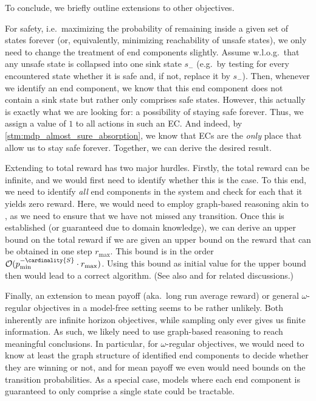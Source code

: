 \documentclass{article}
\newcommand{\States}{S}
\newcommand{\sinkstate}{s_-}
\begin{document}
\begin{remark}
	To conclude, we briefly outline extensions to other objectives.

	For safety, i.e.\ maximizing the probability of remaining inside a given set of states forever (or, equivalently, minimizing reachability of unsafe states), we only need to change the treatment of end components slightly.
	Assume w.l.o.g.\ that any unsafe state is collapsed into one sink state $\sinkstate$ (e.g.\ by testing for every encountered state whether it is safe and, if not, replace it by $\sinkstate$).
	Then, whenever we identify an end component, we know that this end component does not contain a sink state but rather only comprises safe states.
	However, this actually is exactly what we are looking for: a possibility of staying safe forever.
	Thus, we assign a value of $1$ to all actions in such an EC.
	And indeed, by \cref{stm:mdp_almost_sure_absorption}, we know that ECs are the \emph{only} place that allow us to stay safe forever.
	Together, we can derive the desired result.

	Extending to total reward has two major hurdles.
	Firstly, the total reward can be infinite, and we would first need to identify whether this is the case.
	To this end, we need to identify \emph{all} end components in the system and check for each that it yields zero reward.
	Here, we would need to employ graph-based reasoning akin to \cite{DBLP:conf/cav/AshokKW19}, as we need to ensure that we have not missed any transition.
	Once this is established (or guaranteed due to domain knowledge), we can derive an upper bound on the total reward if we are given an upper bound on the reward that can be obtained in one step $r_{\max}$.
	This bound is in the order $\mathcal{O}(p_{\min}^{-\cardinality{\States}} \cdot r_{\max})$.
	Using this bound as initial value for the upper bound then would lead to a correct algorithm.
	(See also \cite[Appendix~B]{DBLP:conf/cav/MeggendorferW24} and \cite[Section~4]{DBLP:journals/fmsd/ChenFKPS13} for related discussions.)

	Finally, an extension to mean payoff (aka.\ long run average reward) or general $\omega$-regular objectives in a model-free setting seems to be rather unlikely.
	Both inherently are infinite horizon objectives, while sampling only ever gives us finite information.
	As such, we likely need to use graph-based reasoning to reach meaningful conclusions.
	In particular, for $\omega$-regular objectives, we would need to know at least the graph structure of identified end components to decide whether they are winning or not, and for mean payoff we even would need bounds on the transition probabilities.
	As a special case, models where each end component is guaranteed to only comprise a single state could be tractable.
\end{remark}
\end{document}
